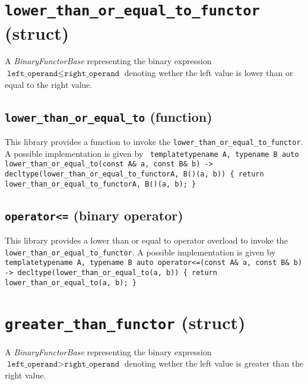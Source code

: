\documentclass[oneside]{book}
\begin{document}
\section{\texttt{lower\_than\_or\_equal\_to\_functor} (struct)}
A \textit{BinaryFunctorBase} representing the binary expression
$\texttt{left\_operand} \leq \texttt{right\_operand}$
denoting wether the left value is lower than or equal to the right value.\newline

\subsection{\texttt{lower\_than\_or\_equal\_to} (function)}
This library provides a function to invoke the \texttt{lower\_than\_or\_equal\_to\_functor}.
A possible implementation is given by\newline
\texttt{
template\textlangle typename A, typename B\textrangle\newline
auto lower\_than\_or\_equal\_to(const A\& a, const B\& b)\newline
-> decltype(lower\_than\_or\_equal\_to\_functor\textlangle A, B\textrangle()(a, b))\newline
\{ return lower\_than\_or\_equal\_to\_functor\textlangle A, B\textrangle()(a, b); \}
}

\subsection{\texttt{operator<=} (binary operator)}
This library provides a lower than or equal to operator overload to invoke the \texttt{lower\_than\_or\_equal\_to\_functor}.
A possible implementation is given by\newline
\texttt{
template\textlangle typename A, typename B\textrangle\newline
auto operator<=(const A\& a, const B\& b)\newline
-> decltype(lower\_than\_or\_equal\_to(a, b))\newline
\{ return lower\_than\_or\_equal\_to(a, b); \}
}

\section{\texttt{greater\_than\_functor} (struct)}
A \textit{BinaryFunctorBase} representing the binary expression
$\texttt{left\_operand} > \texttt{right\_operand}$
denoting wether the left value is greater than the right value.\newline
\end{document}

